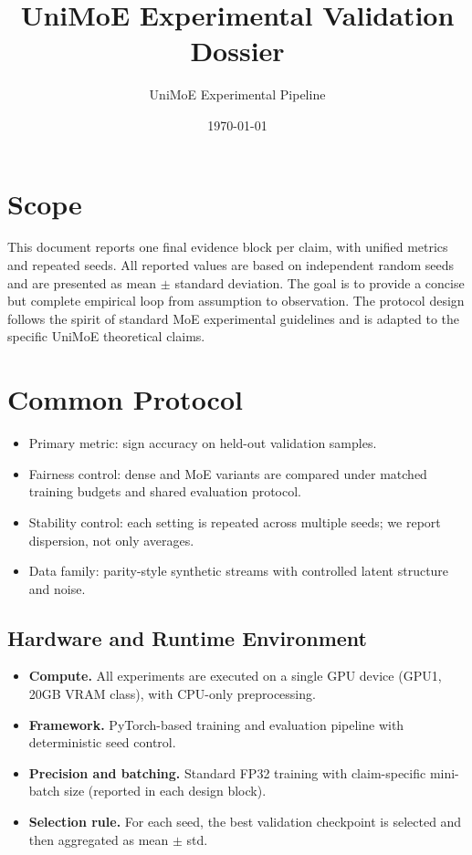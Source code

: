 \documentclass[11pt]{article}
\title{UniMoE Experimental Validation Dossier}
\author{UniMoE Experimental Pipeline}
\date{\today}
\begin{document}
\maketitle

\section{Scope}
This document reports one final evidence block per claim, with unified metrics and repeated seeds.
All reported values are based on independent random seeds and are presented as mean $\pm$ standard deviation.
The goal is to provide a concise but complete empirical loop from assumption to observation.
The protocol design follows the spirit of standard MoE experimental guidelines and is adapted to the specific UniMoE theoretical claims.

\section{Common Protocol}
\begin{itemize}
    \item Primary metric: sign accuracy on held-out validation samples.
    \item Fairness control: dense and MoE variants are compared under matched training budgets and shared evaluation protocol.
    \item Stability control: each setting is repeated across multiple seeds; we report dispersion, not only averages.
    \item Data family: parity-style synthetic streams with controlled latent structure and noise.
\end{itemize}

\subsection{Hardware and Runtime Environment}
\begin{itemize}
    \item \textbf{Compute.} All experiments are executed on a single GPU device (GPU1, 20GB VRAM class), with CPU-only preprocessing.
    \item \textbf{Framework.} PyTorch-based training and evaluation pipeline with deterministic seed control.
    \item \textbf{Precision and batching.} Standard FP32 training with claim-specific mini-batch size (reported in each design block).
    \item \textbf{Selection rule.} For each seed, the best validation checkpoint is selected and then aggregated as mean $\pm$ std.
\end{itemize}
\end{document}
